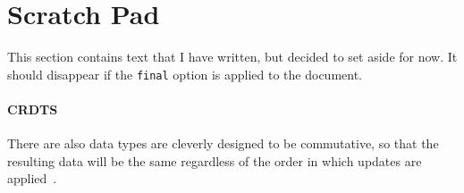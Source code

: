 \section*{Scratch Pad}

This section contains text that I have written, but decided to set aside for now.
It should disappear if the \lstinline{final} option is applied to the document.

\paragraph{CRDTS}
There are also data types are cleverly designed to be commutative, so that the resulting data will be the same regardless of the order in which updates are applied~\cite{crdt_orig}.

